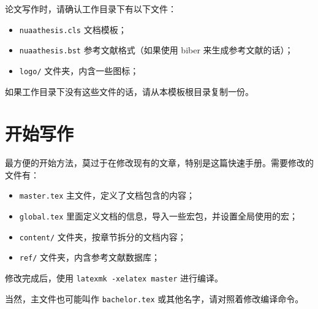 论文写作时，请确认工作目录下有以下文件：
\begin{itemize}
  \item \verb|nuaathesis.cls| 文档模板；
  \item \verb|nuaathesis.bst| 参考文献格式（如果使用 biber 来生成参考文献的话）；
  \item \verb|logo/| 文件夹，内含一些图标；
\end{itemize}

如果工作目录下没有这些文件的话，请从本模板根目录复制一份。

\section{开始写作}

最方便的开始方法，莫过于在修改现有的文章，特别是这篇快速手册。需要修改的文件有：
\begin{itemize}
  \item \verb|master.tex| 主文件，定义了文档包含的内容；
  \item \verb|global.tex| 里面定义文档的信息，导入一些宏包，并设置全局使用的宏；
  \item \verb|content/| 文件夹，按章节拆分的文档内容；
  \item \verb|ref/| 文件夹，内含参考文献数据库；
\end{itemize}

修改完成后，使用 \verb|latexmk -xelatex master| 进行编译。

当然，主文件也可能叫作 \verb|bachelor.tex| 或其他名字，请对照着修改编译命令。
